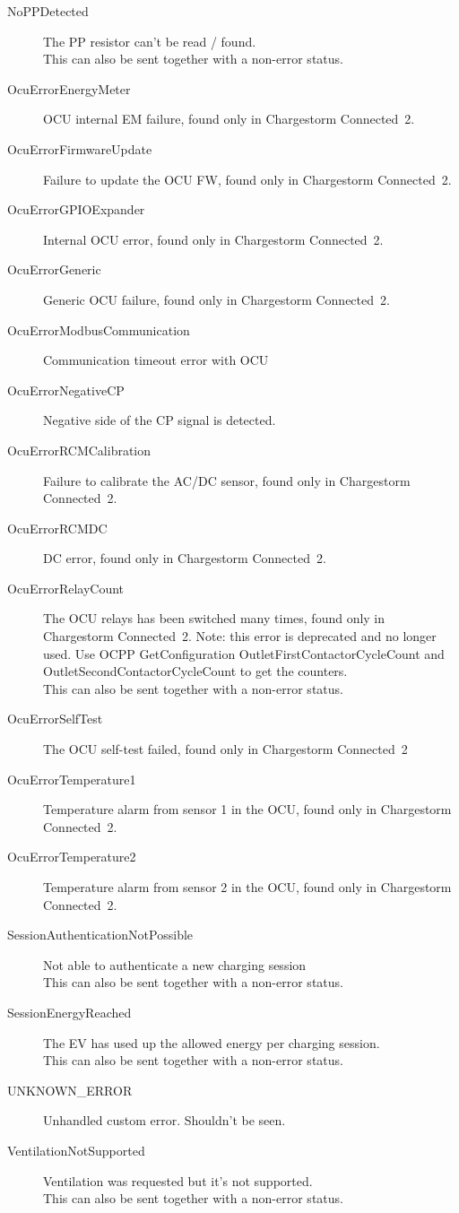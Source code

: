 \begin{description}
\item[NoPPDetected] The PP resistor can't be read / found.\\This can also be sent together with a non-error status.
\item[OcuErrorEnergyMeter] OCU internal EM failure, found only in Chargestorm Connected~2.
\item[OcuErrorFirmwareUpdate] Failure to update the OCU FW, found only in Chargestorm Connected~2.
\item[OcuErrorGPIOExpander] Internal OCU error, found only in Chargestorm Connected~2.
\item[OcuErrorGeneric] Generic OCU failure, found only in Chargestorm Connected~2.
\item[OcuErrorModbusCommunication] Communication timeout error with OCU
\item[OcuErrorNegativeCP] Negative side of the CP signal is detected.
\item[OcuErrorRCMCalibration] Failure to calibrate the AC/DC sensor, found only in Chargestorm Connected~2.
\item[OcuErrorRCMDC] DC error, found only in Chargestorm Connected~2.
\item[OcuErrorRelayCount] The OCU relays has been switched many times, found only in Chargestorm Connected~2. Note: this error is deprecated and no longer used. Use OCPP GetConfiguration OutletFirstContactorCycleCount and OutletSecondContactorCycleCount to get the counters.\\This can also be sent together with a non-error status.
\item[OcuErrorSelfTest] The OCU self-test failed, found only in Chargestorm Connected~2
\item[OcuErrorTemperature1] Temperature alarm from sensor 1 in the OCU, found only in Chargestorm Connected~2.
\item[OcuErrorTemperature2] Temperature alarm from sensor 2 in the OCU, found only in Chargestorm Connected~2.
\item[SessionAuthenticationNotPossible] Not able to authenticate a new charging session\\This can also be sent together with a non-error status.
\item[SessionEnergyReached] The EV has used up the allowed energy per charging session.\\This can also be sent together with a non-error status.
\item[UNKNOWN\_ERROR] Unhandled custom error. Shouldn't be seen.
\item[VentilationNotSupported] Ventilation was requested but it's not supported.\\This can also be sent together with a non-error status.
\end{description}


